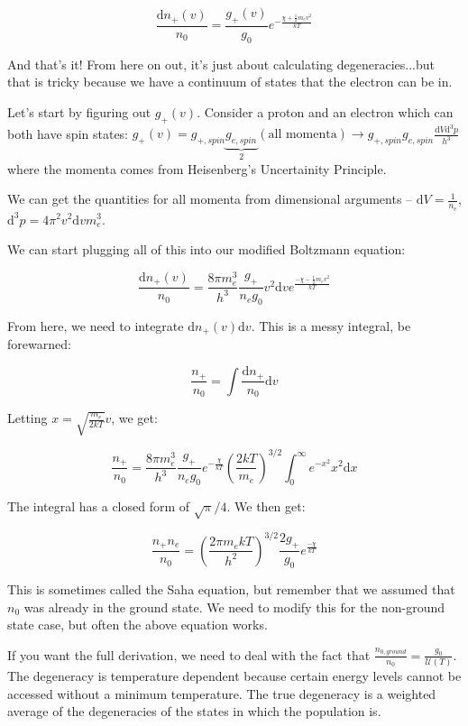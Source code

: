 \documentclass{article}
\begin{document}
$$
\frac{\mathrm{d}n_+(v)}{n_0} = \frac{g_+(v)}{g_0} e^{-\frac{\chi + \frac12 m_e v^2}{kT}}
$$

And that's it! From here on out, it's just about calculating degeneracies...but that is tricky because we have a continuum of states that the electron can be in. 

Let's start by figuring out $g_+(v)$. Consider a proton and an electron which can both have spin states: $g_+(v) = g_{+,spin} \underbrace{g_{e,spin}}_{2} (\text{all momenta}) \rightarrow g_{+,spin} g_{e,spin} \frac{\mathrm{d}V\mathrm{d}^3p}{h^3}$ where the momenta comes from Heisenberg's Uncertainity Principle. 

We can get the quantities for all momenta from dimensional arguments -- $\mathrm{d}V = \frac{1}{n_e}$, $\mathrm{d}^3p = 4\pi^2 v^2 \mathrm{d} v m_e^3$.

We can start plugging all of this into our modified Boltzmann equation:

$$
\frac{\mathrm{d}n_+(v)}{n_0} = \frac{8\pi m_e^3}{h^3} \frac{g_+ }{n_e g_0 }v^2 \mathrm{d}v e^{\frac{-\chi - \frac12 m_e v^2}{kT}}
$$

From here, we need to integrate $\mathrm{d}n_+(v) \mathrm{d}v$. This is a messy integral, be forewarned:

$$
\frac{n_+}{n_0} = \int \frac{\mathrm{d}n_+}{n_0}\mathrm{d}v
$$

Letting $x=\sqrt{\frac{m_e}{2kT}}v$, we get:

$$
\frac{n_+}{n_0} =  \frac{8\pi m_e^3}{h^3} \frac{g_+}{n_e g_0} e^{-\frac{\chi}{ kT}} \left(\frac{2kT}{m_e}\right)^{3/2}\int_0^{\infty} e^{-x^2} x^2 \mathrm{d}x
$$

The integral has a closed form of $\sqrt{\pi}/4$. We then get:

$$
\frac{n_+ n_e}{n_0} = \left(\frac{2\pi m_e kT}{h^2}\right)^{3/2} \frac{2g_+}{g_0} e^{\frac{-\chi}{kT}}
$$

This is sometimes called the Saha equation, but remember that we assumed that $n_0$ was already in the ground state. We need to modify this for the non-ground state case, but often the above equation works. 

If you want the full derivation, we need to deal with the fact that $\frac{n_{0,ground}}{n_0} = \frac{g_0}{\mathcal{U}(T)}$. The degeneracy is temperature dependent because certain energy levels cannot be accessed without a minimum temperature. The true degeneracy is a weighted average of the degeneracies of the states in which the population is. 
\end{document}
